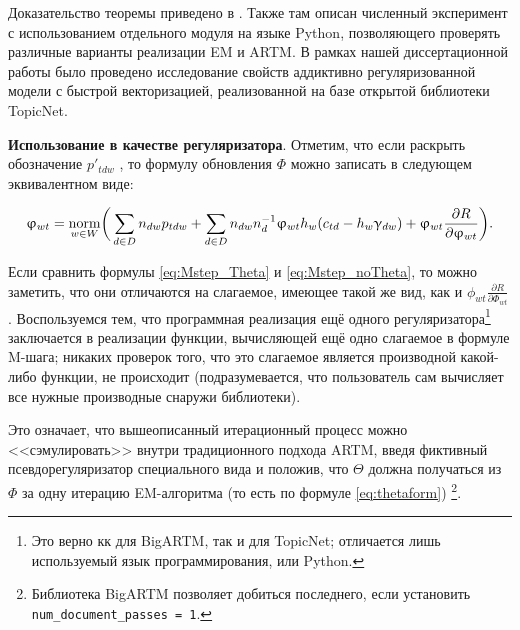 Доказательство теоремы приведено в \cite{thetaless}. Также там описан численный эксперимент с использованием отдельного модуля на языке Python, позволяющего проверять различные варианты реализации EM и ARTM. В рамках нашей диссертационной работы было проведено исследование свойств аддиктивно регуляризованной модели с быстрой векторизацией, реализованной на базе открытой библиотеки TopicNet.

\textbf{Использование в качестве регуляризатора}. Отметим, что если раскрыть обозначение $p'_{tdw}$ , то формулу обновления $\Phi$ можно записать в следующем эквивалентном виде:

\begin{equation} \label{eq:Mstep_noTheta}   
    \upvarphi_{wt} = \mathop{\mathrm{norm}}\limits_{w\in W}
        \biggl(\,
        \sum_{d\in D} n_{dw} p_{tdw}
        + \sum_{d\in D} n_{dw} n_d^{-1} \upvarphi_{wt}h_w (c_{td}-h_w\upgamma_{dw})
        + \upvarphi_{wt} \frac{\partial{R}}{\partial{\ensuremath{\upvarphi}_{wt}}}
        \biggr).
\end{equation}

Если сравнить формулы \ref{eq:Mstep_Theta} и \ref{eq:Mstep_noTheta}, то можно заметить, что они отличаются на слагаемое, имеющее такой же вид, как и $\phi_{wt} \frac{\partial{R}}{\partial{\Phi_{wt}}}$. Воспользуемся тем, что программная реализация ещё одного регуляризатора\footnote{Это верно кк для BigARTM, так и для TopicNet; отличается лишь используемый язык программирования, \cpp или Python.}  заключается в реализации функции, вычисляющей ещё одно слагаемое в формуле M-шага; никаких проверок того, что это слагаемое является производной какой-либо функции, не происходит (подразумевается, что пользователь сам вычисляет все нужные производные снаружи библиотеки).

Это означает, что вышеописанный итерационный процесс можно <<сэмулировать>> внутри традиционного подхода ARTM, введя фиктивный псевдорегуляризатор специального вида и положив, что $\Theta$ должна получаться из $\Phi$ за одну итерацию EM-алгоритма (то есть по формуле \ref{eq:thetaform}) \footnote{Библиотека BigARTM позволяет добиться последнего, если установить \texttt{num\_document\_passes\ =\ 1}.}.


